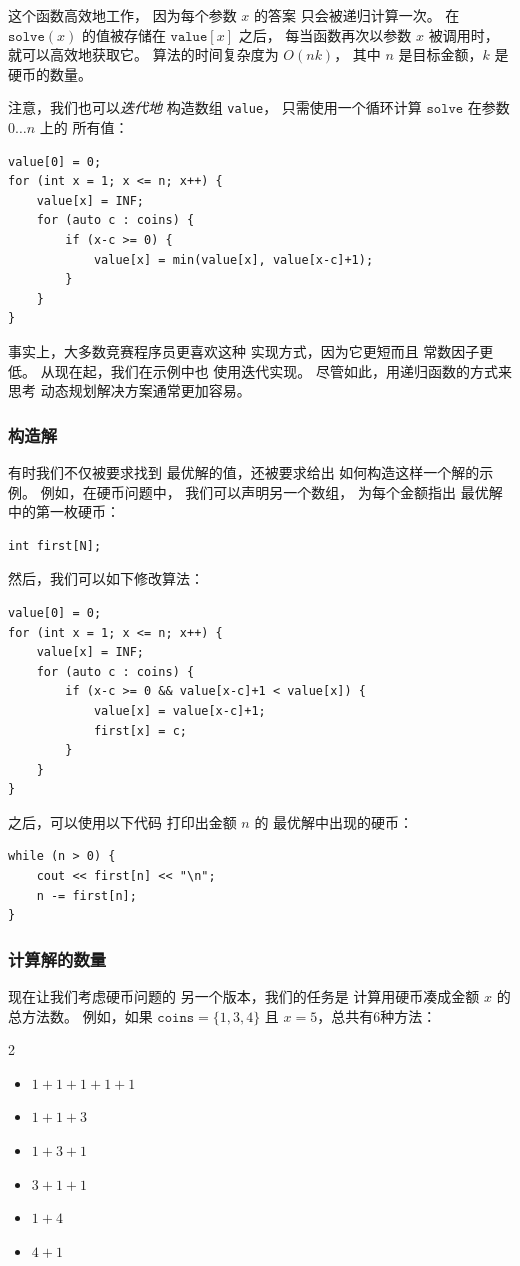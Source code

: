 这个函数高效地工作，
因为每个参数 $x$ 的答案
只会被递归计算一次。
在 $\texttt{solve}(x)$ 的值被存储在 $\texttt{value}[x]$ 之后，
每当函数再次以参数 $x$ 被调用时，
就可以高效地获取它。
算法的时间复杂度为 $O(nk)$，
其中 $n$ 是目标金额，$k$ 是硬币的数量。

注意，我们也可以\emph{迭代地}
构造数组 \texttt{value}，
只需使用一个循环计算
$\texttt{solve}$ 在参数 $0 \ldots n$ 上的
所有值：
\begin{lstlisting}
value[0] = 0;
for (int x = 1; x <= n; x++) {
    value[x] = INF;
    for (auto c : coins) {
        if (x-c >= 0) {
            value[x] = min(value[x], value[x-c]+1);
        }
    }
}
\end{lstlisting}

事实上，大多数竞赛程序员更喜欢这种
实现方式，因为它更短而且
常数因子更低。
从现在起，我们在示例中也
使用迭代实现。
尽管如此，用递归函数的方式来思考
动态规划解决方案通常更加容易。


\subsubsection{构造解}

有时我们不仅被要求找到
最优解的值，还被要求给出
如何构造这样一个解的示例。
例如，在硬币问题中，
我们可以声明另一个数组，
为每个金额指出
最优解中的第一枚硬币：
\begin{lstlisting}
int first[N];
\end{lstlisting}
然后，我们可以如下修改算法：
\begin{lstlisting}
value[0] = 0;
for (int x = 1; x <= n; x++) {
    value[x] = INF;
    for (auto c : coins) {
        if (x-c >= 0 && value[x-c]+1 < value[x]) {
            value[x] = value[x-c]+1;
            first[x] = c;
        }
    }
}
\end{lstlisting}
之后，可以使用以下代码
打印出金额 $n$ 的
最优解中出现的硬币：
\begin{lstlisting}
while (n > 0) {
    cout << first[n] << "\n";
    n -= first[n];
}
\end{lstlisting}

\subsubsection{计算解的数量}

现在让我们考虑硬币问题的
另一个版本，我们的任务是
计算用硬币凑成金额 $x$ 的
总方法数。
例如，如果 $\texttt{coins}=\{1,3,4\}$ 且
$x=5$，总共有6种方法：

\begin{multicols}{2}
\begin{itemize}
\item $1+1+1+1+1$
\item $1+1+3$
\item $1+3+1$
\item $3+1+1$
\item $1+4$
\item $4+1$
\end{itemize}
\end{multicols}

